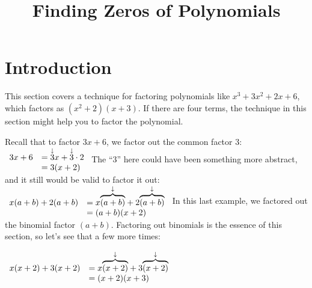 \documentclass{ximera}
\author{}
\title{Finding Zeros of Polynomials}
\begin{document}
\begin{abstract}
  
\end{abstract}
\maketitle






\section{Introduction}


   This section covers a technique for factoring polynomials like $x^3+3x^2+2x+6$,
      which factors as $(x^2+2)(x+3)$.
      If there are four terms,
      the technique in this section might
      help you to factor the polynomial.

   Recall that to factor $3x+6$,
      we factor out the common factor $3$:
$
     \begin{array}{rl}
        3x+6 & =\mathord{\overset{\downarrow}{3}}x+\mathord{\overset{\downarrow}{3}}\cdot2 \\
        & =3(x+2)
  \end{array}
$   
      The ``$3$'' here could have been something more abstract,
      and it still would be valid to factor it out:
$
\begin{array}{rl}
 x(a+b)+2(a+b)&=x\mathord{\overset{\downarrow}{\overbrace{(a+b)}}}+2\mathord{\overset{\downarrow}{\overbrace{(a+b)}}}\\
        &=(a+b)(x+2)
\end{array}
$
      In this last example, we factored out the binomial factor $(a+b)$.
      Factoring out binomials is the essence of this section,
      so let's see that a few more times:
\begin{center}
$\begin{array}{rl}
        x(x+2)+3(x+2)&=x\mathord{\overset{\downarrow}{\overbrace{(x+2)}}}+3\mathord{\overset{\downarrow}{\overbrace{(x+2)}}}\\
        &=(x+2)(x+3)
\end{array}
$
\end{center}
\end{document}
